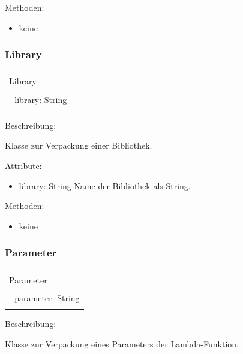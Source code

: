 \documentclass[a4paper,20pt,oneside]{book}
\begin{document}
	Methoden:
	\begin{itemize}
	\item keine
	\end{itemize}
	
	\subsubsection{Library}
		\centering
	\begin{tabular}{|l|}
	\hline \\
	Library\\
	\hline \\
	- library: String\\
   
    \hline \\
	\hline 
	\end{tabular}
	
	\raggedright
	\vspace{0.5cm}
	Beschreibung:
	
	Klasse zur Verpackung einer Bibliothek.
	
	\vspace{0.5cm}
	Attribute:
	\begin{itemize}
    \item library: String \linebreak
    Name der Bibliothek als String.
	\end{itemize}
	
	Methoden:
	\begin{itemize}
	\item keine
	\end{itemize}
	
	\subsubsection{Parameter}
		\centering
	\begin{tabular}{|l|}
	\hline \\
	Parameter\\
	\hline \\
	- parameter: String\\
   
    \hline \\
	\hline 
	\end{tabular}
	
	\raggedright
	\vspace{0.5cm}
	Beschreibung:
	
	Klasse zur Verpackung eines Parameters der Lambda-Funktion.
	
\end{document}
